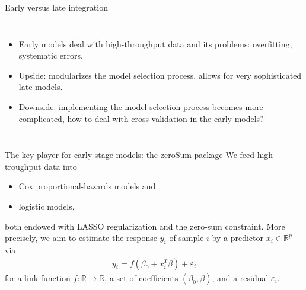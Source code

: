 \documentclass[10pt, aspectratio=169]{beamer}
\begin{document}
\begin{frame}{Early versus \alert{late} integration}
  \begin{columns}
      \centering
      \begin{itemize}
        \item Early models deal with high-throughput data and its problems: overfitting, 
          systematic errors.
        \item Upside: modularizes the model selection process, allows for very
          sophisticated late models.
        \item Downside: implementing the model selection process becomes more 
          complicated, how to deal with cross validation in the early models?
      \end{itemize}
  \end{columns}
\end{frame}

\begin{frame}{The key player for early-stage models: the zeroSum package}
  We feed high-troughput data into 

  \begin{itemize}
    \item \alert{Cox} proportional-hazards models and
    \item \alert{logistic} models,
  \end{itemize}

  both endowed with \alert{LASSO} regularization and the \alert{zero-sum} constraint. More precisely, we 
  aim to estimate the response $y_i$ of sample $i$ by a predictor $x_i \in \mathbb{R}^p$ via 
  \begin{align}
    y_i = f(\beta_0 + x_i^T \beta) + \varepsilon_i
  \end{align}
  for a link function $f: \mathbb{R} \to \mathbb{R}$, a set of coefficients $(\beta_0, 
  \beta)$, and a residual $\varepsilon_i$.
\end{frame}
\end{document}
